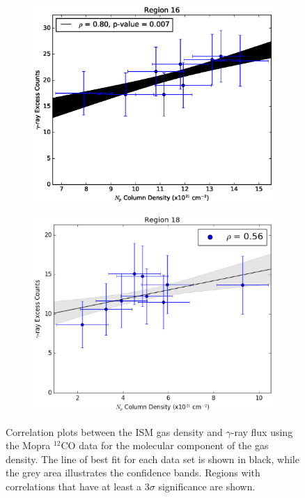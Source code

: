 \documentclass[12pt,a4paper]{article}
\begin{document}
\begin{figure}[H]
\begin{subfigure}{0.5\textwidth}
		\includegraphics[width=0.9\linewidth, height=0.25\textheight]{gamma_mHI_reg16}
	\end{subfigure}
	\begin{subfigure}{0.5\textwidth}
	\centering
	\includegraphics[width=0.95\linewidth, height=0.25\textheight]{gamma_mHI_reg18}
	\end{subfigure}
	\caption{Correlation plots between the ISM gas density and $\gamma$-ray flux using the Mopra $^{12}$CO data for the molecular component of the gas density. The line of best fit for each data set is shown in black, while the grey area illustrates the confidence bands. Regions with correlations that have at least a 3$\sigma$ significance are shown.}
	\label{fig:regionalgasgammacormop}
\end{figure}
\end{document}
